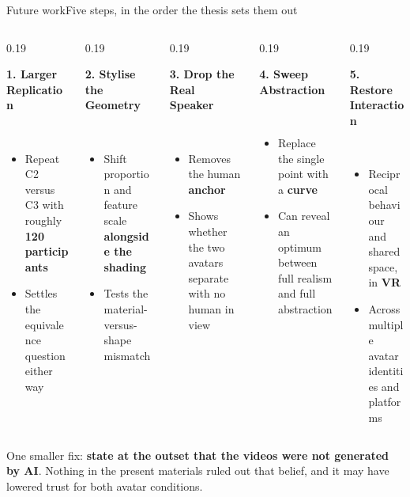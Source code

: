 \documentclass[aspectratio=169,10pt]{beamer}
\newcommand{\hl}[1]{{\color{knblue}\textbf{#1}}}
\newcommand{\panelhead}[1]{\noindent\colorbox{kncyan}{\parbox{0.96\textwidth}{\centering\vspace{1pt}\color{white}\scriptsize\bfseries #1\vspace{1pt}}}\\[0.25em]}
\newcommand{\panel}[1]{\noindent\colorbox{knlight}{\parbox{0.96\textwidth}{\vspace{2pt}\scriptsize
\begin{itemize}\setlength{\itemsep}{0.2em}\setlength{\leftmargini}{1.1em}#1\end{itemize}\vspace{2pt}}}}
\begin{document}
\begin{frame}{Future work}{Five steps, in the order the thesis sets them out}
  \vspace{0.6em}
  \begin{columns}[T]
    \begin{column}{0.19\textwidth}
      \panelhead{1. Larger Replication}
      \panel{%
        \item Repeat C2 versus C3 with roughly \hl{120 participants}
        \item Settles the equivalence question either way}
    \end{column}
    \begin{column}{0.19\textwidth}
      \panelhead{2. Stylise the Geometry}
      \panel{%
        \item Shift proportion and feature scale \hl{alongside the shading}
        \item Tests the material-versus-shape mismatch}
    \end{column}
    \begin{column}{0.19\textwidth}
      \panelhead{3. Drop the Real Speaker}
      \panel{%
        \item Removes the human \hl{anchor}
        \item Shows whether the two avatars separate with no human in view}
    \end{column}
    \begin{column}{0.19\textwidth}
      \panelhead{4. Sweep Abstraction}
      \panel{%
        \item Replace the single point with a \hl{curve}
        \item Can reveal an optimum between full realism and full abstraction}
    \end{column}
    \begin{column}{0.19\textwidth}
      \panelhead{5. Restore Interaction}
      \panel{%
        \item Reciprocal behaviour and shared space, in \hl{VR}
        \item Across multiple avatar identities and platforms}
    \end{column}
  \end{columns}
  \vfill
  \noindent\colorbox{knlight}{\parbox{0.975\textwidth}{\scriptsize\color{knblue}
  One smaller fix: \textbf{state at the outset that the videos were not generated by AI}. Nothing in the present materials ruled out that belief, and it may have lowered trust for both avatar conditions.}}
\end{frame}
\end{document}
